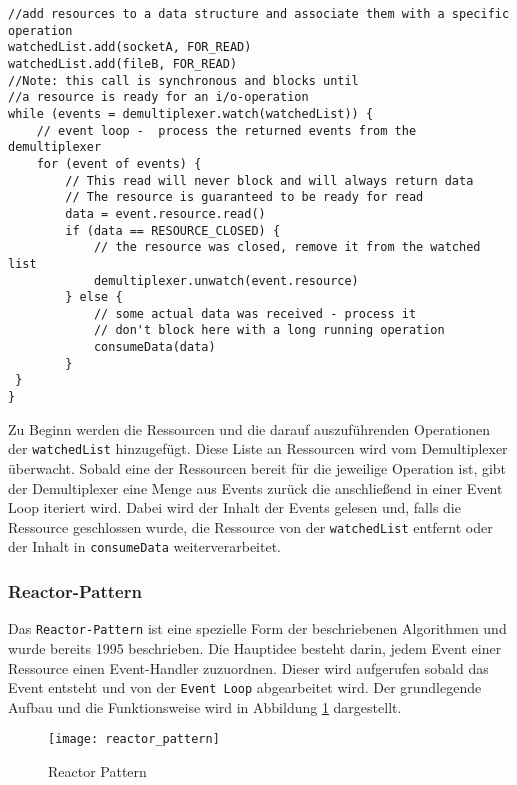 \begin{lstlisting}[caption=Einfaches Pseudocode-Beispiel für Synchronous Event Demultiplexing mit Event Loop,
captionpos=b, label=lst:EventLoop_Pseudocode]
//add resources to a data structure and associate them with a specific operation
watchedList.add(socketA, FOR_READ)                            
watchedList.add(fileB, FOR_READ)
//Note: this call is synchronous and blocks until
//a resource is ready for an i/o-operation
while (events = demultiplexer.watch(watchedList)) {
	// event loop -  process the returned events from the demultiplexer
	for (event of events) {
		// This read will never block and will always return data
		// The resource is guaranteed to be ready for read
		data = event.resource.read()
		if (data == RESOURCE_CLOSED) {
			// the resource was closed, remove it from the watched list
			demultiplexer.unwatch(event.resource)
		} else {
			// some actual data was received - process it 
			// don't block here with a long running operation
			consumeData(data)
		}
 }
}
\end{lstlisting}
Zu Beginn werden die Ressourcen und die darauf auszuführenden Operationen der \verb|watchedList| hinzugefügt.
Diese Liste an Ressourcen wird vom Demultiplexer überwacht. Sobald eine der Ressourcen bereit
für die jeweilige Operation ist, gibt der Demultiplexer eine Menge aus Events zurück die anschließend in einer
Event Loop iteriert wird. Dabei wird der Inhalt der Events gelesen und, falls die Ressource
geschlossen wurde, die Ressource von der \verb|watchedList| entfernt oder der Inhalt in \verb|consumeData| weiterverarbeitet.
\parencite[Event Demultiplexing]{NodeJSDesignPatterns}

\newpage
\subsubsection{Reactor-Pattern}
\label{subsubsec:reactor_pattern}
Das \verb|Reactor-Pattern| ist eine spezielle Form der beschriebenen Algorithmen und wurde bereits 1995 beschrieben.\parencite{SchmidtReactorPattern}
Die Hauptidee besteht darin, jedem Event einer Ressource einen Event-Handler zuzuordnen.
Dieser wird aufgerufen sobald das Event entsteht und von der \verb|Event Loop| abgearbeitet wird.
Der grundlegende Aufbau und die Funktionsweise wird in Abbildung \ref{fig:reactor_pattern} dargestellt.
\begin{figure}[H]
  \centering
  \texttt{[image: reactor\_pattern]}
  \caption{Reactor Pattern \parencite[Abbildung 1.3]{NodeJSDesignPatterns}}
  \label{fig:reactor_pattern}
\end{figure}


